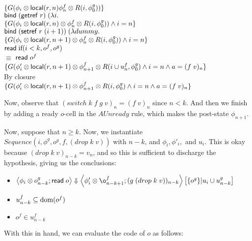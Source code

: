 \documentclass{article}
\begin{document}
\begin{tabbing}
$\{{G(\phi_i \otimes \mbox{\textsf{{local}}}({r}, {n}) \phi^f_n \otimes R(i, \phi^g_0))}\}$ \\
$\mbox{\textsf{{bind}}}\; (\mbox{\textsf{{getref}}}\; r) \;(\lambda i.$ \\
$\{G(\phi_i \otimes \mbox{\textsf{{local}}}({r}, {n}) \otimes \phi^f_n \otimes R(i, \phi^g_0)) \land i = n\}$ \\
$\mbox{\textsf{{bind}}}\; (\mbox{\textsf{{setref}}}\; r\;(i+1)) \;(\lambda dummy.\;$ \\
$\{G(\phi_i \otimes \mbox{\textsf{{local}}}({r}, {n+1}) \otimes \phi^f_n \otimes R(i, \phi^g_0)) \land i = n\}$ \\
$\mbox{\textsf{{read}}}\; \mbox{if}(i < k, o^f, o^g)$ \\
$\equiv$
$\mbox{\textsf{{read}}}\; o^f$ \\
$\{G(\phi'_i \otimes \mbox{\textsf{{local}}}({r}, {n+1}) \otimes \phi^f_{n+1} \otimes R(i \cup u^f_n, \phi^g_0) \land i = n \land a = (f\;v)_n\}$ \\
By closure \\
$\{G(\phi'_i \otimes \mbox{\textsf{{local}}}({r}, {n+1}) \otimes \phi^f_{n+1} \otimes R(i, \phi^g_0) \land i = n \land a = (f\;v)_n\}$ \\
\end{tabbing}

Now, observe that $(switch\;k\;f\;g\;v)_n = (f\;v)_n$ since $n < k$.
And then we finish by adding a ready $o$-cell in the $AUnready$ rule,
which makes the post-state $\phi_{n+1}$.

Now, suppose that $n \geq k$. Now, we instantiate $Sequence(i, \phi^g, o^g, f, (drop\;k\;v))$ 
with $n - k$, and $\phi_i, \phi'_i,$ and $u_i$. This is okay because $(drop\;k\;v)_{n-k} = v_n$,
and so this is sufficient to discharge the hypothesis, giving us the conclusions:

\begin{itemize}
\item $\astep{\phi_i \otimes o^g_{n-k}}{\readcell o}
             {\phi'_i \otimes \o^f_{n-k+1}}{(g\;(drop\;k\;v))_{n-k}}
             {\setof{o^g}}{u_i \cup u^g_{n-k}}$
\item $u^f_{n-k} \subseteq \mbox{dom}({o^f})$
\item $o^f \in u^f_{n-k}$
\end{itemize}

With this in hand, we can evaluate the code of $o$ as follows:
\end{document}
